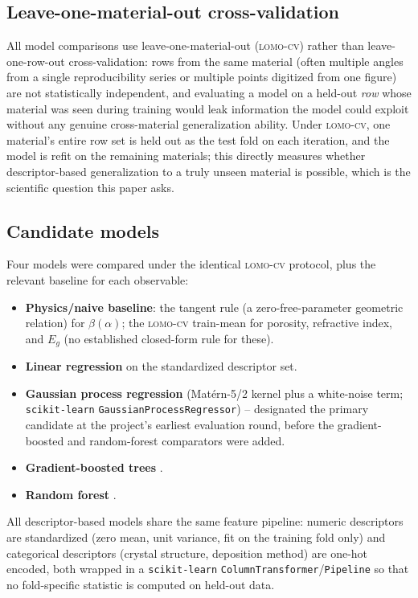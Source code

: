 \documentclass[aip,amsmath,amssymb,reprint]{revtex4-1}
\newcommand{\lomo}{\textsc{lomo-cv}}
\begin{document}
\subsection{Leave-one-material-out cross-validation}
\label{ssec:lomo}

All model comparisons use leave-one-material-out (\lomo{}) rather than
leave-one-row-out cross-validation: rows from the same material
(often multiple angles from a single reproducibility series or
multiple points digitized from one figure) are not statistically
independent, and evaluating a model on a held-out \emph{row} whose
material was seen during training would leak information the model
could exploit without any genuine cross-material generalization
ability. Under \lomo{}, one material's entire row set is held out as
the test fold on each iteration, and the model is refit on the
remaining materials; this directly measures whether descriptor-based
generalization to a truly unseen material is possible, which is the
scientific question this paper asks.

\subsection{Candidate models}
\label{ssec:models}

Four models were compared under the identical \lomo{} protocol, plus
the relevant baseline for each observable:
\begin{itemize}
  \item \textbf{Physics/naive baseline}: the tangent rule (a
    zero-free-parameter geometric relation) for $\beta(\alpha)$; the
    \lomo{} train-mean for porosity, refractive index, and $E_g$
    (no established closed-form rule for these).
  \item \textbf{Linear regression} on the standardized descriptor set.
  \item \textbf{Gaussian process regression} (Mat\'{e}rn-5/2 kernel plus
    a white-noise term; \texttt{scikit-learn}
    \texttt{GaussianProcessRegressor}) \citep{rasmussen2006gp,%
    pedregosa2011sklearn} -- designated the primary candidate at the
    project's earliest evaluation round, before the gradient-boosted
    and random-forest comparators were added.
  \item \textbf{Gradient-boosted trees}
    \citep{friedman2001gbm,pedregosa2011sklearn}.
  \item \textbf{Random forest} \citep{breiman2001randomforest,%
    pedregosa2011sklearn}.
\end{itemize}
All descriptor-based models share the same feature pipeline: numeric
descriptors are standardized (zero mean, unit variance, fit on the
training fold only) and categorical descriptors (crystal structure,
deposition method) are one-hot encoded, both wrapped in a
\texttt{scikit-learn} \texttt{ColumnTransformer}/\texttt{Pipeline} so
that no fold-specific statistic is computed on held-out data.
\end{document}
